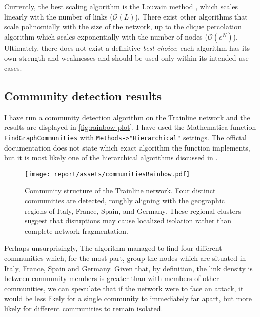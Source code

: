 Currently, the best scaling algorithm is the Louvain method \cite{barabasi282}, which scales linearly with the number of links ($\mathcal O(L)$). There exist other algorithms that scale polinomially with the size of the network, up to the clique percolation algorithm \cite{cliquepercolation} which scales exponentially with the number of nodes ($\mathcal O(e^N)$). Ultimately, there does not exist a definitive \emph{best choice}; each algorithm has its own strength and weaknesses and should be used only within its intended use cases.

\subsection{Community detection results}
I have run a community detection algorithm on the Trainline network and the results are displayed in \autoref{fig:rainbow-plot}.
I have used the Mathematica function \verb|FindGraphCommunities| \cite{findgraphcommunities} with \verb|Methods->"Hierarchical"| settings. The official documentation does not state which exact algorithm the function implements, but it is most likely one of the hierarchical algorithms discussed in \cite{communityDetection}.

\begin{figure}
    \centering
    \texttt{[image: report/assets/communitiesRainbow.pdf]}
    \caption{Community structure of the Trainline network.
Four distinct communities are detected, roughly aligning with the geographic regions of Italy, France, Spain, and Germany. These regional clusters suggest that disruptions may cause localized isolation rather than complete network fragmentation.}
    \label{fig:rainbow-plot}
\end{figure}
Perhaps unsurprisingly, The algorithm managed to find four different communities which, for the most part, group the nodes which are situated in Italy, France, Spain and Germany. Given that, by definition, the link density is between community members is greater than with members of other communities, we can speculate that if the network were to face an attack, it would be less likely for a single community to immediately far apart, but more likely for different communities to remain isolated. 


